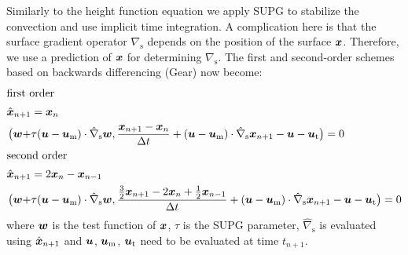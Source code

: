 Similarly to the height function equation we apply SUPG to stabilize the
convection and use implicit time integration. A complication here is that the
surface gradient operator $\nabla_\text{s}$ depends on the position of the
surface $\boldsymbol{x}$. Therefore, we use a prediction of $\boldsymbol{x}$ for determining
$\nabla_\text{s}$. The first and second-order schemes based on backwards
differencing (Gear) now become:
\begin{align*}
\intertext{first order}
  \hat{\boldsymbol{x}}_{n+1}&= \boldsymbol{x}_n\\
 \big(\boldsymbol{w}+&\tau(\boldsymbol{u} - \boldsymbol{u}_\text{m})\cdot\hat\nabla_\text{s}\boldsymbol{w},
  \frac{\boldsymbol{x}_{n+1}-\boldsymbol{x}_n}{\Delta t} 
+(\boldsymbol{u} - \boldsymbol{u}_\text{m})\cdot\hat\nabla_\text{s}\boldsymbol{x}_{n+1}-\boldsymbol{u} - \boldsymbol{u}_\text{t}\big)= 0\\
\intertext{second order}
  \hat{\boldsymbol{x}}_{n+1}&= 2\boldsymbol{x}_n-\boldsymbol{x}_{n-1}\\
 \big(\boldsymbol{w}+&\tau(\boldsymbol{u} - \boldsymbol{u}_\text{m})\cdot\hat\nabla_\text{s}\boldsymbol{w},
  \frac{\tfrac32\boldsymbol{x}_{n+1}-2\boldsymbol{x}_n+\tfrac12\boldsymbol{x}_{n-1}}{\Delta t} 
+(\boldsymbol{u} - \boldsymbol{u}_\text{m})\cdot\hat\nabla_\text{s}\boldsymbol{x}_{n+1}-\boldsymbol{u} - \boldsymbol{u}_\text{t}\big)= 0
\end{align*}
where $\boldsymbol{w}$ is the test function of $\boldsymbol{x}$, $\tau$ is the SUPG parameter,
 $\hat\nabla_\text{s}$ is evaluated using
$\hat{\boldsymbol{x}}_{n+1}$ and $\boldsymbol{u}$, $\boldsymbol{u}_\text{m}$, $\boldsymbol{u}_\text{t}$ need to
be evaluated at time $t_{n+1}$.


